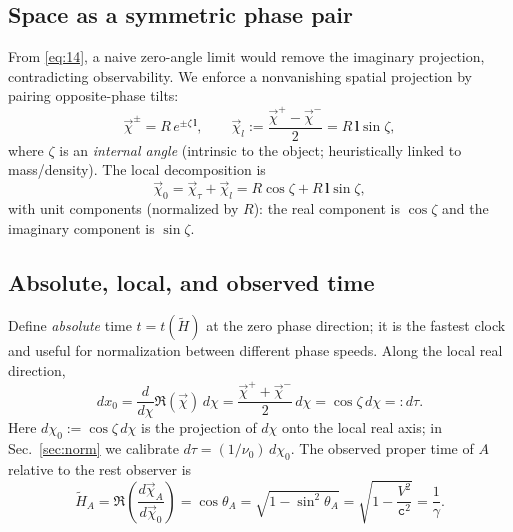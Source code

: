 \documentclass[11pt]{article}
\numberwithin{equation}{section}
\begin{document}
\subsection{Space as a symmetric phase pair}
From \eqref{eq:14}, a naive zero-angle limit would remove the imaginary projection, contradicting observability. We enforce a nonvanishing spatial projection by pairing opposite-phase tilts:
\begin{equation}
\vec{\chi}^{\pm}=R\,e^{\pm\zeta\,\mathbf{l}},\qquad
\vec{\chi}_l:=\frac{\vec{\chi}^+-\vec{\chi}^-}{2}=R\,\mathbf{l}\sin\zeta,
\label{eq:311}
\end{equation}
where $\zeta$ is an \emph{internal angle} (intrinsic to the object; heuristically linked to mass/density). The local decomposition is
\begin{equation}
\vec{\chi}_0=\vec{\chi}_\tau+\vec{\chi}_l
=R\cos\zeta+R\,\mathbf{l}\sin\zeta,
\label{eq:312}
\end{equation}
with unit components (normalized by $R$): the real component is $\cos\zeta$ and the imaginary component is $\sin\zeta$.

\subsection{Absolute, local, and observed time}
Define \emph{absolute} time $t=t(\tilde{H})$ at the zero phase direction; it is the fastest clock and useful for normalization between different phase speeds. Along the local real direction,
\begin{equation}
dx_0=\frac{d}{d\chi}\Re(\vec{\chi})\,d\chi
=\frac{\vec{\chi}^+ + \vec{\chi}^-}{2}\,d\chi
=\cos\zeta\,d\chi
=:d\tau.
\label{eq:321}
\end{equation}
Here $d\chi_0:=\cos\zeta\,d\chi$ is the projection of $d\chi$ onto the local real axis; in Sec.~\ref{sec:norm} we calibrate $d\tau=(1/\nu_0)\,d\chi_0$. The observed proper time of $A$ relative to the rest observer is
\begin{equation}
\tilde{H}_A=\Re\!\left(\frac{d\vec{\chi}_A}{d\vec{\chi}_0}\right)
=\cos\theta_A
=\sqrt{1-\sin^2\theta_A}
=\sqrt{1-\frac{V^2}{\mathtt{c}^2}}
=\frac{1}{\gamma}.
\label{eq:322}
\end{equation}
\end{document}
